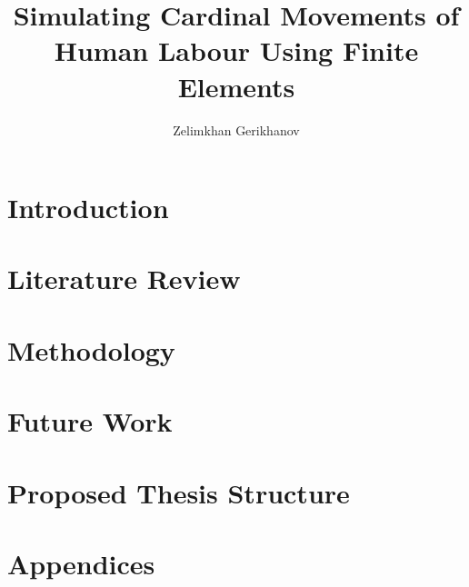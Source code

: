 \documentclass[oneside,12pt]{CUEDthesisPSnPDF}
\title{Simulating Cardinal Movements of Human Labour Using Finite Elements}
\author{Zelimkhan Gerikhanov}
\begin{document}
\maketitle

\listoffixmes
{}
\tableofcontents
\listoffigures
\listoftables



\clearpage
{}

\chapter{Introduction}\label{chap-introduction}


\chapter{Literature Review}\label{chap-literature}



\chapter{Methodology}\label{chap-methodology}







\chapter{Future Work}\label{chap-future}


\chapter{Proposed Thesis Structure}\label{chap-thesis}



%


\chapter{Appendices}


\end{document}
